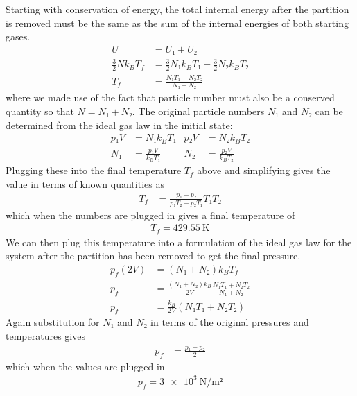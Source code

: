 Starting with conservation of energy, the total internal energy after the
partition is removed must be the same as the sum of the internal energies of
both starting gases.
\begin{align*}
    U &= U₁ + U₂ \\
    \frac 32 Nk_B T_f &= \frac 32 N₁k_B T₁ + \frac 32 N₂k_B T₂ \\
    T_f &= \frac{N₁T₁ + N₂T₂}{N₁ + N₂}
\end{align*}
where we made use of the fact that particle number must also be a conserved
quantity so that $N = N₁ + N₂$. The original particle numbers $N₁$ and $N₂$
can be determined from the ideal gas law in the initial state:
\begin{align*}
    p₁V &= N₁k_B T₁             &   p₂V &= N₂ k_B T₂ \\
    N₁ &= \frac{p₁V}{k_B T₁}    &   N₂ &= \frac{p₂V}{k_B T₂}
\end{align*}
Plugging these into the final temperature $T_f$ above and simplifying gives
the value in terms of known quantities as
\begin{align*}
    T_f &= \frac{p₁ + p₂}{p₁T₂ + p₂T₁} T₁T₂
\end{align*}
which when the numbers are plugged in gives a final temperature of
\begin{align}
    \boxed{ T_f = \SI{429.55}{\K} }
\end{align}
We can then plug this temperature into a formulation of the ideal gas law
for the system after the partition has been removed to get the final pressure.
\begin{align*}
    p_f (2V) &= (N₁+N₂) k_B T_f \\
    p_f &= \frac{(N₁+N₂)k_B}{2V} \frac{N₁T₁ + N₂T₂}{N₁+N₂} \\
    p_f &= \frac{k_B}{2V}(N₁T₁ + N₂T₂)
\end{align*}
Again substitution for $N₁$ and $N₂$ in terms of the original pressures and
temperatures gives
\begin{align*}
    p_f &= \frac{p₁ + p₂}{2}
\end{align*}
which when the values are plugged in
\begin{align}
    \boxed{ p_f = \SI{3e3}{\N\per\m²} }
\end{align}

